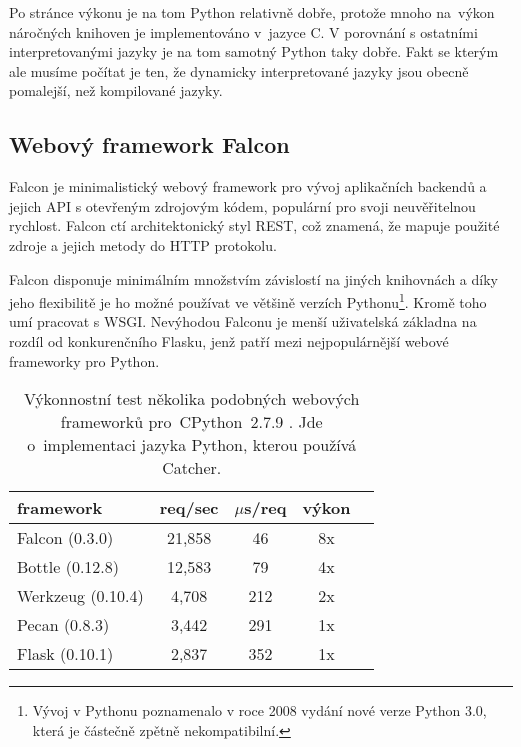\medskip

Po stránce výkonu je na tom Python relativně dobře, protože mnoho na~výkon náročných knihoven je implementováno v~jazyce C.
V porovnání s ostatními interpretovanými jazyky je na tom samotný Python taky dobře.
Fakt se kterým ale musíme počítat je ten, že dynamicky interpretované jazyky jsou obecně pomalejší, než kompilované jazyky.

\subsection{Webový framework Falcon}


\indent

Falcon je minimalistický webový framework pro vývoj aplikačních backendů a jejich API s otevřeným zdrojovým kódem,
populární pro svoji neuvěřitelnou rychlost. Falcon ctí architektonický styl REST, což znamená, že mapuje použité
zdroje a jejich metody do HTTP protokolu.

\medskip

Falcon disponuje minimálním množstvím závislostí na jiných knihovnách a díky jeho flexibilitě je ho možné
používat ve většině verzích Pythonu\footnote{Vývoj v Pythonu poznamenalo v roce 2008 vydání nové verze Python 3.0,
která je částečně zpětně nekompatibilní.}. Kromě toho umí pracovat s WSGI. Nevýhodou Falconu je menší uživatelská
základna na rozdíl od konkurenčního Flasku, jenž patří mezi nejpopulárnější webové frameworky pro Python.

\begin{table}[htb]
\centering
\begin{tabular}{|l||c|c|c|c|}\hline
\bfseries \bfseries framework & \bfseries req/sec & \bfseries $\mu$s/req & \bfseries výkon \\[2mm]
\hline
Falcon (0.3.0) & 21,858 & 46 & 8x \\
\hline
Bottle (0.12.8) & 12,583 & 79 & 4x \\
\hline
Werkzeug (0.10.4) & 4,708 & 212 & 2x \\
\hline
Pecan (0.8.3) & 3,442 & 291 & 1x \\
\hline
Flask (0.10.1) & 2,837 & 352 & 1x \\
\hline
\end{tabular}
\caption{Výkonnostní test několika podobných webových frameworků pro~CPython~2.7.9 \cite{falcon-benchmarks}. Jde o~implementaci jazyka Python, kterou používá Catcher.}
\end{table}

